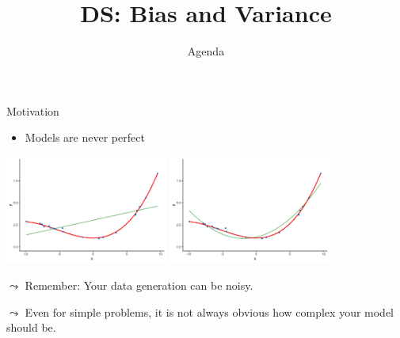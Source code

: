\documentclass[aspectratio=169]{../latex_main/tntbeamer}  %
\title[Statistics]{DS: Bias and Variance}
\subtitle{Agenda}
\begin{document}
	
	\maketitle
	
    \begin{frame}{Motivation}

    \begin{itemize}
        \item Models are never perfect
    \end{itemize}

    \begin{center}
        \includegraphics[width=0.4\textwidth]{Bild9.png}
        \includegraphics[width=0.4\textwidth]{Bild10.png}    
    \end{center}
    
    $\leadsto$ Remember: Your data generation can be noisy.
    
    $\leadsto$ Even for simple problems, it is not always obvious how complex your model should be.

	\end{frame}
	
\end{document}

